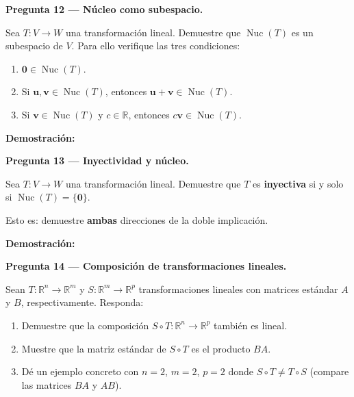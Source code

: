 \documentclass[12pt, letterpaper]{article}
\newcommand{\R}{\mathbb{R}}
\newcommand{\Ker}{\operatorname{Nuc}}   %
\begin{document}
\begin{cajapregunta}
\textbf{Pregunta 12 — Núcleo como subespacio.}

Sea $T:V\to W$ una transformación lineal. Demuestre que $\Ker(T)$ es un subespacio de $V$. Para ello verifique las tres condiciones:
\begin{enumerate}[label=(\roman*)]
  \item $\mathbf{0} \in \Ker(T)$.
  \item Si $\mathbf{u},\mathbf{v}\in\Ker(T)$, entonces $\mathbf{u}+\mathbf{v}\in\Ker(T)$.
  \item Si $\mathbf{v}\in\Ker(T)$ y $c\in\R$, entonces $c\mathbf{v}\in\Ker(T)$.
\end{enumerate}
\end{cajapregunta}

\vspace{4pt}

\noindent\textbf{Demostración:}
\vspace{6cm}

\newpage

\begin{cajapregunta}
\textbf{Pregunta 13 — Inyectividad y núcleo.}

Sea $T:V\to W$ una transformación lineal. Demuestre que $T$ es \textbf{inyectiva} si y solo si $\Ker(T)=\{\mathbf{0}\}$.

\noindent Esto es: demuestre \textbf{ambas} direcciones de la doble implicación.
\end{cajapregunta}

\vspace{4pt}

\noindent\textbf{Demostración:}
\vspace{8cm}

\begin{cajapregunta}
\textbf{Pregunta 14 — Composición de transformaciones lineales.}

Sean $T:\R^n\to\R^m$ y $S:\R^m\to\R^p$ transformaciones lineales con matrices estándar $A$ y $B$, respectivamente. Responda:
\begin{enumerate}[label=\alph*)]
  \item Demuestre que la composición $S\circ T:\R^n\to\R^p$ también es lineal.
  \item Muestre que la matriz estándar de $S\circ T$ es el producto $BA$.
  \item Dé un ejemplo concreto con $n=2$, $m=2$, $p=2$ donde $S\circ T \neq T\circ S$ (compare las matrices $BA$ y $AB$).
\end{enumerate}
\end{cajapregunta}
\end{document}
